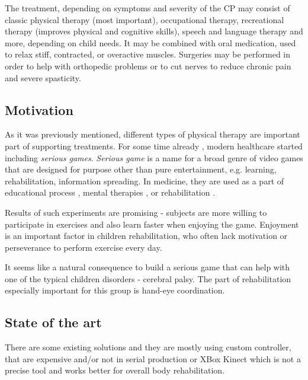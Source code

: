 \documentclass[10pt,a4paper]{article}
\begin{document}
The treatment, depending on symptoms and severity of the CP may consist of classic physical therapy (most important), occupational therapy, recreational therapy (improves physical and cognitive skills), speech and language therapy and more, depending on child needs. It may be combined with oral medication, used to relax stiff, contracted, or overactive muscles. Surgeries may be performed in order to help with orthopedic problems or to cut nerves to reduce chronic pain and severe spasticity.

\subsection*{Motivation}

As it was previously mentioned, different types of physical therapy are important part of supporting treatments. For some time already \cite{rehabilitation}, modern healthcare started including \emph{serious games}. \emph{Serious game} is a name for a broad genre of video games that are designed for purpose other than pure entertainment, e.g. learning, rehabilitation, information spreading. In medicine, they are used as a part of educational process \cite{exercise}, mental therapies \cite{mental_game, mental}, or rehabilitation \cite{physical_rehab, stroke_rehab}. 

Results of such experiments are promising - subjects are more willing to participate in exercises and also learn faster when enjoying the game. Enjoyment is an important factor in children rehabilitation, who often lack motivation or perseverance to perform exercise every day. 

It seems like a natural consequence to build a serious game that can help with one of the typical children disorders - cerebral palsy. The part of rehabilitation especially important for this group is hand-eye coordination.

\subsection*{State of the art}
There are some existing solutions and they are mostly using custom controller\cite{game_custom}, that are expensive and/or not in serial production or XBox Kinect \cite{game_xbox_360} which is not a precise tool and works better for overall body rehabilitation. 
\end{document}

